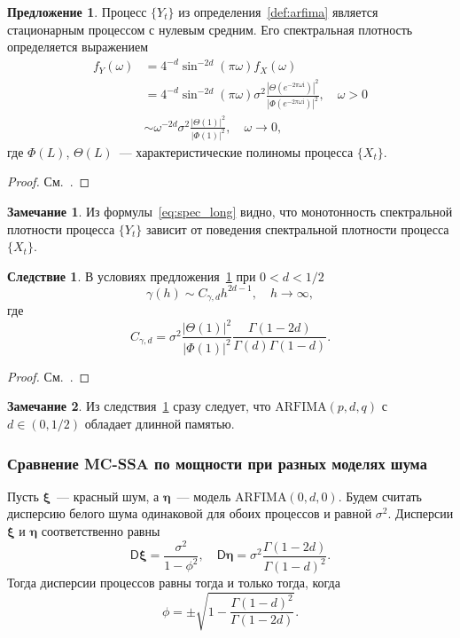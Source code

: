 \documentclass[specialist,
substylefile = spbu_report.rtx,
subf,12pt]{disser}
\theoremstyle{definition}
\newtheorem{remark}{Замечание}[chapter]
\newtheorem{proposition}{Предложение}[chapter]
\newtheorem{corollary}{Следствие}[chapter]
\newcommand{\im}{\mathrm{i}}
\begin{document}
\begin{proposition}\label{prop1}
	Процесс $\{Y_t\}$ из определения~\ref{def:arfima} является стационарным процессом с нулевым средним. Его спектральная плотность определяется выражением
	\begin{equation}\label{eq:spec_long}
		\begin{aligned}
			f_Y(\omega) & =4^{-d}\sin^{-2d}\left(\pi\omega\right)f_X(\omega)                                                                                                      \\
			            & =4^{-d}\sin^{-2d}\left(\pi\omega\right)\sigma^2\frac{\left|\Theta(e^{-2\pi \omega\im})\right|^2}{\left|\Phi(e^{-2\pi\omega\im})\right|^2},\quad\omega>0 \\
			            & \sim\omega^{-2d}\sigma^2\frac{|\Theta(1)|^2}{|\Phi(1)|^2},\quad \omega\to0,
		\end{aligned}
	\end{equation}
	где $\Phi(L)$, $\Theta(L)$~--- характеристические полиномы процесса $\{X_t\}$.
\end{proposition}
\begin{proof}
	См.~\cite[Proposition 6.1]{Hassler2018}.
\end{proof}
\begin{remark}
	Из формулы~\eqref{eq:spec_long} видно, что монотонность спектральной плотности процесса $\{Y_t\}$ зависит от поведения спектральной плотности процесса $\{X_t\}$.
\end{remark}
\begin{corollary}\label{corollary1}
	В условиях предложения~\ref{prop1} при $0<d<1/2$
	\[
		\gamma(h)\sim C_{\gamma,d}h^{2d-1},\quad h\to\infty,
	\]
	где
	\[
		C_{\gamma,d}=\sigma^2 \frac{|\Theta(1)|^2}{|\Phi(1)|^2} \frac{\Gamma(1-2d)}{\Gamma(d)\Gamma(1-d)}.
	\]
\end{corollary}
\begin{proof}
	См.~\cite[Corollary 6.1]{Hassler2018}.
\end{proof}
\begin{remark}
	Из следствия~\ref{corollary1} сразу следует, что $\textrm{ARFIMA}(p, d, q)$ с $d\in(0, 1/2)$ обладает длинной памятью.
\end{remark}

\subsubsection{Сравнение MC-SSA по мощности при разных моделях шума}

Пусть $\bm \xi$~--- красный шум, а $\bm \eta$~--- модель $\textrm{ARFIMA}(0, d, 0)$. Будем считать дисперсию белого шума одинаковой для обоих процессов и равной $\sigma^2$. Дисперсии $\bm\xi$ и $\bm\eta$ соответственно равны
\[
	\mathsf{D}\bm\xi = \frac{\sigma^2}{1 - \phi^2}, \quad \mathsf{D}\bm\eta = \sigma^2\frac{\Gamma(1 - 2d)}{\Gamma(1-d)^2}.
\]
Тогда дисперсии процессов равны тогда и только тогда, когда
\[
	\phi=\pm\sqrt{1-\frac{\Gamma(1-d)^2}{\Gamma(1-2d)}}.
\]
\end{document}
